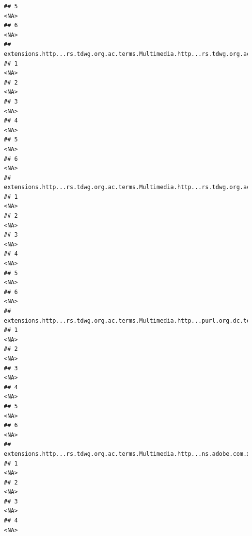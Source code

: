 \documentclass[
]{book}
\begin{document}
\begin{verbatim}
## 5                                                                                <NA>
## 6                                                                                <NA>
##   extensions.http...rs.tdwg.org.ac.terms.Multimedia.http...rs.tdwg.org.ac.terms.variantLiteral.3
## 1                                                                                           <NA>
## 2                                                                                           <NA>
## 3                                                                                           <NA>
## 4                                                                                           <NA>
## 5                                                                                           <NA>
## 6                                                                                           <NA>
##   extensions.http...rs.tdwg.org.ac.terms.Multimedia.http...rs.tdwg.org.ac.terms.accessURI.3
## 1                                                                                      <NA>
## 2                                                                                      <NA>
## 3                                                                                      <NA>
## 4                                                                                      <NA>
## 5                                                                                      <NA>
## 6                                                                                      <NA>
##   extensions.http...rs.tdwg.org.ac.terms.Multimedia.http...purl.org.dc.terms.identifier.4
## 1                                                                                    <NA>
## 2                                                                                    <NA>
## 3                                                                                    <NA>
## 4                                                                                    <NA>
## 5                                                                                    <NA>
## 6                                                                                    <NA>
##   extensions.http...rs.tdwg.org.ac.terms.Multimedia.http...ns.adobe.com.xap.1.0.rights.Owner.4
## 1                                                                                         <NA>
## 2                                                                                         <NA>
## 3                                                                                         <NA>
## 4                                                                                         <NA>

\end{verbatim}
\end{document}
